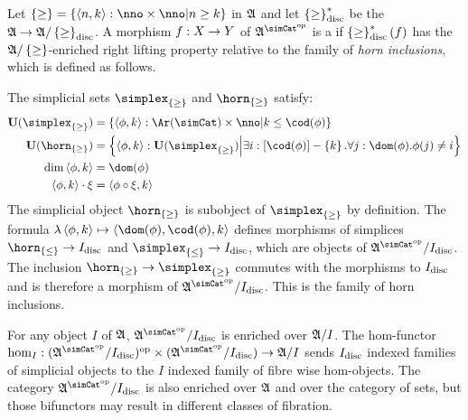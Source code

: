 \documentclass[csh.tex]{subfiles}
\begin{document}
\begin{definition}
Let $\set\geq = \set{\tuplet{n,k}\of \nno\times\nno |n\geq k}$ in $\mathfrak A$ and let $\left\{\geq\right\}_{\rm disc}^*$ be the  $\mathfrak A\to\mathfrak A/\left\{\geq\right\}_{\rm disc}$.
A morphism $f: X\to Y$ of $\ambient\s$ is a  if $\left\{\geq\right\}_{\rm disc}^*(f)$ has the $\mathfrak A/\left\{\geq\right\}$-enriched right lifting property relative to the family of \emph{horn inclusions}, which is defined as follows.

The simplicial sets $\simplex_{\set\geq}$ and $\horn_{\set\geq}$ satisfy:
\begin{align*}
\base(\simplex_{\set\geq}) &= \set{\tuplet{\phi,k}\of\Ar(\simCat)\times\nno\middle| k\leq \cod(\phi) } \\
\base(\horn_{\set\geq}) &= \set{\tuplet{\phi,k}\of\base(\simplex_{\set\geq})\middle| 
\exists i\of[\cod(\phi)]-\set k.\forall j\of \dom(\phi).\phi(j)\neq i} \\
\dim\tuplet{\phi,k} &= \dom(\phi) \\
\tuplet{\phi,k}\cdot \xi &= \tuplet{\phi\circ\xi,k}
\end{align*}
The simplicial object $\horn_{\set\geq}$ is subobject of $\simplex_{\set\geq}$ by definition. 
The formula $\function{\tuplet{\phi,k}}\tuplet{\dom(\phi),\cod(\phi),k}$ defines morphisms of simplices $\horn_{\set\leq}\to I\disc$ and $\simplex_{\set\leq}\to I\disc$, which are objects of $\ambient\s/I\disc$. The inclusion $\horn_{\set\geq}\to\simplex_{\set\geq}$ commutes with the morphisms to $I_{\rm disc}$ and is therefore a morphism of $\ambient\s/I\disc$. This is the family of horn inclusions.

\end{definition}

\begin{remark}\label{fibred enrichment}
For any object $I$ of $\mathfrak A$, $\ambient\s/I\disc$ is enriched over $\mathfrak A/I$. The hom-functor $\hom_I\of(\ambient\s/I\disc)\dual\times(\ambient\s/I\disc)\to\ambient/I$ sends $I_{\rm disc}$ indexed families of simplicial objects to the $I$ indexed family of fibre wise hom-objects. The category $\ambient\s/I\disc$ is also enriched over $\mathfrak A$ and over the category of sets, but those bifunctors may result in different classes of fibration. 
\end{remark}
\end{document}
